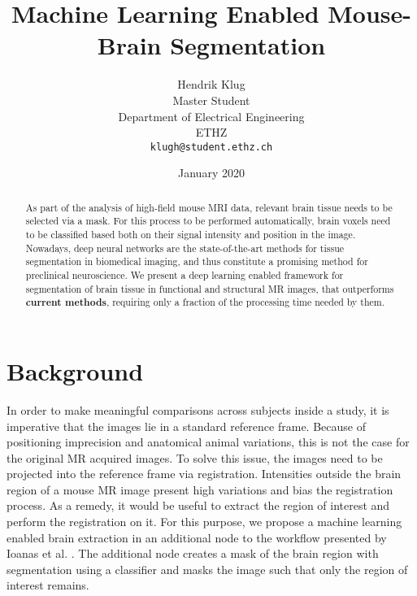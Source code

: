 \documentclass{article}
\title{Machine Learning Enabled Mouse-Brain Segmentation}
\author{
 Hendrik Klug \\
  Master Student\\
  Department of Electrical Engineering\\
  ETHZ\\
  \texttt{klugh@student.ethz.ch} \\\date{January 2020}}
\begin{document}
\maketitle

\begin{abstract}
As part of the analysis of high-field mouse MRI data, relevant brain tissue needs to be selected via a mask.
For this process to be performed automatically, brain voxels need to be classified based both on their signal intensity and position in the image.
Nowadays, deep neural networks are the state-of-the-art methods for tissue segmentation in biomedical imaging, and thus constitute a promising method for preclinical neuroscience.
We present a deep learning enabled framework for segmentation of brain tissue in functional and structural MR images, that outperforms \textbf{current methods}, requiring only a fraction of the processing time needed by them.
\end{abstract}


\section{Background}
In order to make meaningful comparisons across subjects inside a study, it is imperative that the images lie in a standard reference frame.
Because of positioning imprecision and anatomical animal variations, this is not the case for the original MR acquired images.
To solve this issue, the images need to be projected into the reference frame via registration. 
Intensities outside the brain region of a mouse MR image present high variations and bias the registration process.
As a remedy, it would be useful to extract the region of interest and perform the registration on it.
For this purpose, we propose a machine learning enabled brain extraction in an additional node to the workflow presented by Ioanas et al. \cite{ioanas_optimized_2019}.
The additional node creates a mask of the brain region with segmentation using a classifier and masks the image such that only the region of interest remains.
\end{document}
